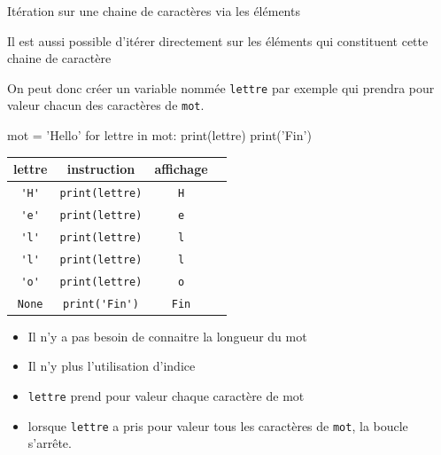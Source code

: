 	\begin{easybox}{Itération sur une chaine de caractères via les éléments}{}

	Il est aussi possible	d'itérer directement sur les éléments qui constituent cette chaine de caractère
	
	On peut donc créer un variable nommée \verb+lettre+ par exemple qui prendra pour valeur chacun des caractères de \verb+mot+.
	
	\medskip
	
	\begin{minipage}{0.48\linewidth}
	\begin{CodePythontexAlt}[Largeur=1\linewidth,Centre,PremLigne=1]{}
	mot = 'Hello'
	for lettre in mot:
		print(lettre)
	print('Fin')
	
		\end{CodePythontexAlt}
	\end{minipage}\hfill
	\begin{minipage}{0.48\linewidth}
		\begin{center}
			\renewcommand{\arraystretch}{1}
			\begin{tabular}{|c|c|c|c|}
				\hline
				lettre  & instruction & affichage \\ \hline{}
				\verb+'H'+  & \verb+print(lettre)+ & \verb+H+ \\ \hline{}
				\verb+'e'+  & \verb+print(lettre)+ & \verb+e+ \\ \hline{}
				\verb+'l'+  & \verb+print(lettre)+ & \verb+l+ \\ \hline{}
				\verb+'l'+  & \verb+print(lettre)+ & \verb+l+ \\ \hline{}
				\verb+'o'+  & \verb+print(lettre)+ & \verb+o+ \\ \hline{}
				\verb+None+  & \verb+print('Fin')+ & \verb+Fin+ \\ \hline
			\end{tabular}	
		\end{center}
	
	
	\end{minipage}
	\begin{itemize}
		\item Il n'y a pas besoin de connaitre la longueur du mot
		\item Il n'y  plus l'utilisation d'indice
		\item \verb+lettre+ prend pour valeur chaque caractère de mot
		\item lorsque \verb+lettre+ a pris pour valeur tous les caractères de \verb+mot+, la boucle s'arrête.
	\end{itemize}								
	\end{easybox}
	
